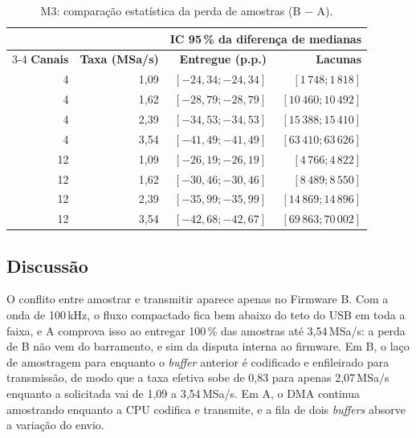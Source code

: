 \begin{table}[H]
  \centering
  \caption{M3: comparação estatística da perda de amostras (B $-$ A).}
  \label{tab:m3-estat}
  \begin{tabular}{@{}rrrr@{}}
    \toprule
    & & \multicolumn{2}{c}{\textbf{IC 95\,\% da diferença de medianas}} \\
    \cmidrule(l){3-4}
    \textbf{Canais} & \textbf{Taxa (MSa/s)} &
    \textbf{Entregue (p.p.)} & \textbf{Lacunas} \\
    \midrule
    4 & 1{,}09 & $[-24{,}34; -24{,}34]$ & $[1\,748; 1\,818]$ \\
    4 & 1{,}62 & $[-28{,}79; -28{,}79]$ & $[10\,460; 10\,492]$ \\
    4 & 2{,}39 & $[-34{,}53; -34{,}53]$ & $[15\,388; 15\,410]$ \\
    4 & 3{,}54 & $[-41{,}49; -41{,}49]$ & $[63\,410; 63\,626]$ \\
    \midrule
    12 & 1{,}09 & $[-26{,}19; -26{,}19]$ & $[4\,766; 4\,822]$ \\
    12 & 1{,}62 & $[-30{,}46; -30{,}46]$ & $[8\,489; 8\,550]$ \\
    12 & 2{,}39 & $[-35{,}99; -35{,}99]$ & $[14\,869; 14\,896]$ \\
    12 & 3{,}54 & $[-42{,}68; -42{,}67]$ & $[69\,863; 70\,002]$ \\
    \bottomrule
  \end{tabular}
\end{table}

\subsection{Discussão}

O conflito entre amostrar e transmitir aparece apenas no Firmware B. Com
a onda de 100\,kHz, o fluxo compactado fica bem abaixo do teto do
\ac{USB} em toda a faixa, e A comprova isso ao entregar 100\,\% das
amostras até 3,54\,MSa/s: a perda de B não vem do barramento, e sim da
disputa interna ao firmware. Em B, o laço de amostragem para enquanto o
\emph{buffer} anterior é codificado e enfileirado para transmissão, de modo
que a taxa efetiva sobe de 0,83 para apenas 2,07\,MSa/s
enquanto a solicitada vai de 1,09 a 3,54\,MSa/s. Em A, o \ac{DMA} continua amostrando
enquanto a \ac{CPU} codifica e transmite, e a fila de dois \emph{buffers}
absorve a variação do envio.

